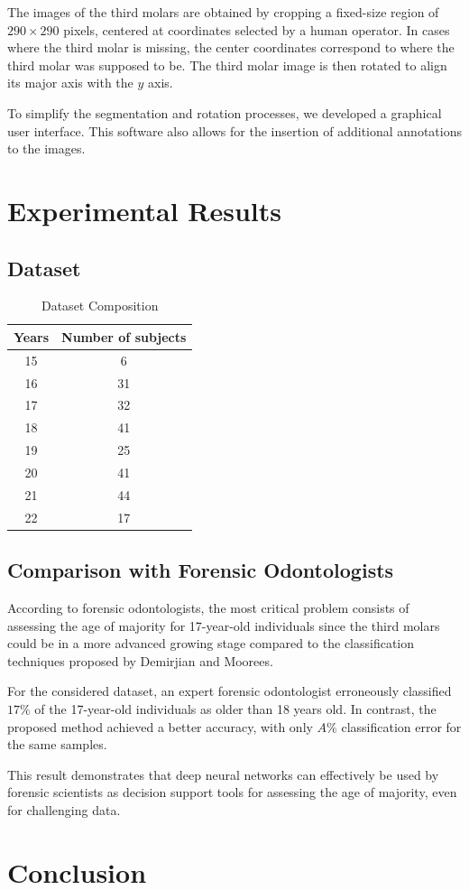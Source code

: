 \documentclass[conference]{IEEEtran}
\begin{document}
The images of the third molars are obtained by cropping a fixed-size region of $290 \times 290$ pixels, centered at coordinates selected by a human operator. In cases where the third molar is missing, the center coordinates correspond to where the third molar was supposed to be. The third molar image is then rotated to align its major axis with the $y$ axis.

To simplify the segmentation and rotation processes, we developed a graphical user interface. This software also allows for the insertion of additional annotations to the images.

\section{Experimental Results}
\subsection{Dataset}

\begin{table}[t]
	\centering
	\caption{Dataset Composition}
	\begin{tabular}{cc}
		\hline
		\hline
		Years & Number of subjects \\
		\hline
		15    & 6 \\
		16    & 31 \\
		17    & 32 \\
		18    & 41 \\
		19    & 25 \\
		20    & 41 \\
		21    & 44 \\
		22    & 17 \\
		\hline
		\hline
	\end{tabular}%
	\label{tabDB}%
\end{table}%


\subsection{Comparison with Forensic Odontologists}
According to forensic odontologists, the most critical problem consists of assessing the age of majority for 17-year-old individuals since the third molars could be in a more advanced growing stage compared to the classification techniques proposed by Demirjian and Moorees.

For the considered dataset, an expert forensic odontologist erroneously classified $17\%$ of the 17-year-old individuals as older than 18 years old. In contrast, the proposed method achieved a better accuracy, with only $A\%$ classification error for the same samples.

This result demonstrates that deep neural networks can effectively be used by forensic scientists as decision support tools for assessing the age of majority, even for challenging data.

\section{Conclusion}





\end{document}
